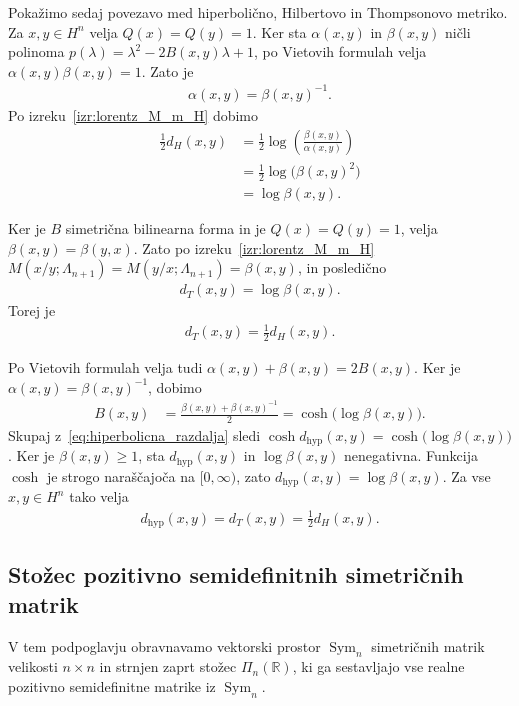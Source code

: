 \documentclass[mat2, tisk]{fmfdelo}
\newcommand{\R}{\mathbb{R}}
\begin{document}
Pokažimo sedaj povezavo med hiperbolično, Hilbertovo in Thompsonovo
metriko. Za $x,y\in H^n$ velja $Q(x)=Q(y)=1$. Ker sta
$\alpha(x,y)$ in $\beta(x,y)$ ničli polinoma
$p(\lambda) =
\lambda^2-2B(x,y)\lambda+1$,
po Vietovih formulah velja
$\alpha(x,y)\beta(x,y)=1$.
Zato je
\begin{align*}
\alpha(x,y)=\beta(x,y)^{-1}.
\end{align*}
Po izreku~\ref{izr:lorentz_M_m_H} dobimo
\begin{align*}
\frac{1}{2}d_H(x,y)
&=
\frac{1}{2}
\log\left(
\frac{\beta(x,y)}{\alpha(x,y)}
\right)\\
&=
\frac{1}{2}
\log\bigl(\beta(x,y)^2\bigr)\\
&=
\log\beta(x,y).
\end{align*}

Ker je $B$ simetrična bilinearna forma in je $Q(x)=Q(y)=1$, velja
$\beta(x,y)=\beta(y,x)$.
Zato po izreku~\ref{izr:lorentz_M_m_H}
$M(x/y;\Lambda_{n+1})
= M(y/x;\Lambda_{n+1})
= \beta(x,y)$,
in posledično
\begin{align*}
d_T(x,y)
=
\log\beta(x,y).
\end{align*}
Torej je 
\begin{align}
d_T(x,y)
=
\frac{1}{2}d_H(x,y).
\label{eq:lorentz_H_T}
\end{align}

Po Vietovih formulah velja tudi
$\alpha(x,y)+\beta(x,y)
= 2B(x,y)$.
Ker je $\alpha(x,y)=\beta(x,y)^{-1}$, dobimo
\begin{align*}
B(x,y)
&=
\frac{\beta(x,y)+\beta(x,y)^{-1}}{2}=
\cosh\bigl(\log\beta(x,y)\bigr).
\end{align*}
Skupaj z~\eqref{eq:hiperbolicna_razdalja} sledi
$\cosh d_{\mathrm{hyp}}(x,y) =
\cosh\bigl(\log\beta(x,y)\bigr)$.
Ker je $\beta(x,y)\geq1$, sta
$d_{\mathrm{hyp}}(x,y)$ in $\log\beta(x,y)$ nenegativna. Funkcija
$\cosh$ je strogo naraščajoča na $[0,\infty)$, zato
$d_{\mathrm{hyp}}(x,y)
= \log\beta(x,y)$.
Za vse $x,y\in H^n$ tako velja
\begin{align*}
d_{\mathrm{hyp}}(x,y)
=
d_T(x,y)
=
\frac{1}{2}d_H(x,y).
\end{align*}





\subsection{Stožec pozitivno semidefinitnih simetričnih matrik}

V tem podpoglavju obravnavamo vektorski prostor
$\operatorname{Sym}_n$ simetričnih matrik velikosti $n\times n$ in
strnjen zaprt stožec $\Pi_n(\R)$, ki ga sestavljajo vse realne pozitivno
semidefinitne matrike iz $\operatorname{Sym}_n$.
\end{document}
